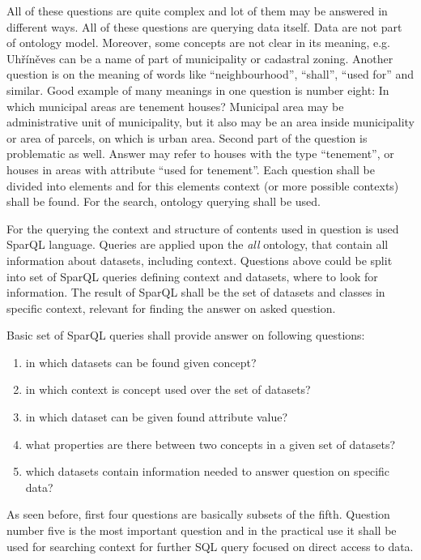 \documentclass{lncs-template/llncs}
\begin{document}
All of these questions are quite complex and lot of them may be answered in different ways. All of these questions are querying data itself. Data are not part of ontology model. Moreover, some concepts are not clear in its meaning, e.g. Uh{\v r}{\' i}n{\v e}ves can be a name of part of municipality or cadastral zoning. Another question is on the meaning of words like ``neighbourhood'', ``shall'', ``used for'' and similar. Good example of many meanings in one question is number eight: In which municipal areas are tenement houses? Municipal area may be administrative unit of municipality, but it also may be an area inside municipality or area of parcels, on which is urban area. Second part of the question is problematic as well. Answer may refer to houses with the type ``tenement'', or houses in areas with attribute ``used for tenement''. Each question shall be divided into elements and for this elements context (or more possible contexts) shall be found. For the search, ontology querying shall be used.

For the querying the context and structure of contents used in question is used SparQL language. Queries are applied upon the \textit{all} ontology, that contain all information about datasets, including context. Questions above could be split into set of SparQL queries defining context and datasets, where to look for information. The result of SparQL shall be the set of datasets and classes in specific context, relevant for finding the answer on asked question.

Basic set of SparQL queries shall provide answer on following questions:
\begin{enumerate}
\item in which datasets can be found given concept?
\item in which context is concept used over the set of datasets? 
\item in which dataset can be given found attribute value?
\item what properties are there between two concepts in a given set of datasets?
\item which datasets contain information needed to answer question on specific data?
\end{enumerate}

As seen before, first four questions are basically subsets of the fifth. Question number five is the most important question and in the practical use it shall be used for searching context for further SQL query focused on direct access to data. 
\end{document}
